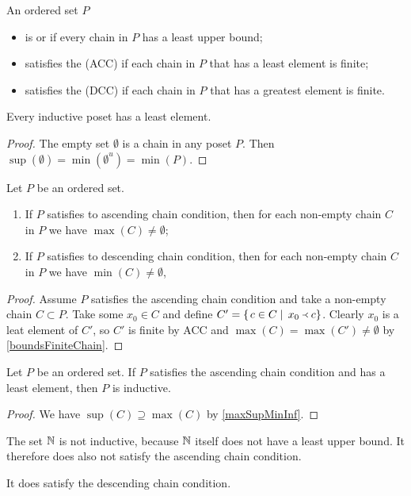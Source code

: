 \begin{definition}
An ordered set $P$
\begin{itemize}
\item is  or  if every chain in $P$ has a least upper bound;
\item satisfies the  (ACC) if each chain in $P$ that has a least element is finite;
\item satisfies the  (DCC) if each chain in $P$ that has a greatest element is finite.
\end{itemize}
\end{definition}

\begin{lemma}
Every inductive poset has a least element.
\end{lemma}
\begin{proof}
The empty set $\emptyset$ is a chain in any poset $P$. Then $\sup(\emptyset) = \min(\emptyset^u) = \min(P)$.
\end{proof}

\begin{lemma}
Let $P$ be an ordered set.
\begin{enumerate}
\item If $P$ satisfies to ascending chain condition, then for each non-empty chain $C$ in $P$ we have $\max(C) \neq \emptyset$;
\item If $P$ satisfies to descending chain condition, then for each non-empty chain $C$ in $P$ we have $\min(C) \neq \emptyset$,
\end{enumerate}
\end{lemma}
\begin{proof}
Assume $P$ satisfies the ascending chain condition and take a non-empty chain $C\subset P$. Take some $x_0\in C$ and define $C' = \left\{\left. c\in C \;\right|\; x_0 \Yleft c \right\}$. Clearly $x_0$ is a leat element of $C'$, so $C'$ is finite by ACC and $\max(C) = \max(C') \neq \emptyset$ by \ref{boundsFiniteChain}.
\end{proof}
\begin{corollary}
Let $P$ be an ordered set. If $P$ satisfies the ascending chain condition and has a least element, then $P$ is inductive.
\end{corollary}
\begin{proof}
We have $\sup(C) \supseteq \max(C)$ by \ref{maxSupMinInf}.
\end{proof}

\begin{example}
The set $\mathbb{N}$ is not inductive, because $\mathbb{N}$ itself does not have a least upper bound. It therefore does also not satisfy the ascending chain condition.

It does satisfy the descending chain condition.
\end{example}



